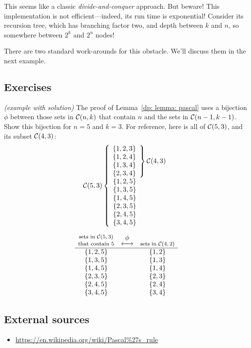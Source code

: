 This seems like a classic \emph{divide-and-conquer} approach.
But beware!  This implementation is not efficient---indeed, its run time is exponential!  Consider its recursion tree,
which has branching factor two, and depth between $k$ and $n$,
so somewhere between $2^k$ and $2^n$ nodes!

There are two standard work-arounds for this obstacle.
We'll discuss them in the next example.

\subsection*{Exercises}

\exercise\emph{(example with solution)}\label{dp: exercise: choose}
The proof of Lemma~\ref{dp: lemma: pascal} uses a bijection $\phi$ between
those sets in ${\cal C}(n, k)$ that contain $n$ and the sets in ${\cal C}(n-1, k-1)$.
Show this bijection for $n=5$ and $k=3$.
For reference, here is all of ${\cal C}(5,3)$, and its subset ${\cal C}(4,3)$:
\[
  \calC(5,3)\left\{
  \begin{array}{l}
    \left.\begin{array}{@{\!}l}
            \{1,2,3\} \\
            \{1,2,4\} \\
            \{1,3,4\} \\
            \{2,3,4\}
          \end{array}
    \right\} \calC(4,3) \\
    \{1,2,5\} \\
    \{1,3,5\} \\
    \{1,4,5\} \\
    \{2,3,5\} \\
    \{2,4,5\} \\
    \{3,4,5\}
  \end{array}
  \right.
\]

\solution
\[
  \begin{array}{ccc}
    \footnotesize\shortstack{sets in $\calC(5,3)$ \\ that contain $5$}
    & \shortstack{$\phi$\\$\longleftrightarrow$}
    & \footnotesize\shortstack{sets in $\calC(4,2)$} \\ \hline
    \{1,2,5\} && \{1, 2\} \\
    \{1,3,5\} && \{1, 3\} \\
    \{1,4,5\} && \{1, 4\} \\
    \{2,3,5\} && \{2, 3\}\\
    \{2,4,5\} && \{2, 4\}\\
    \{3,4,5\} && \{3, 4\}
  \end{array}
\]
\subsection*{External sources}
\begin{itemize}
\item \url{https://en.wikipedia.org/wiki/Pascal\%27s_rule}
\end{itemize}

